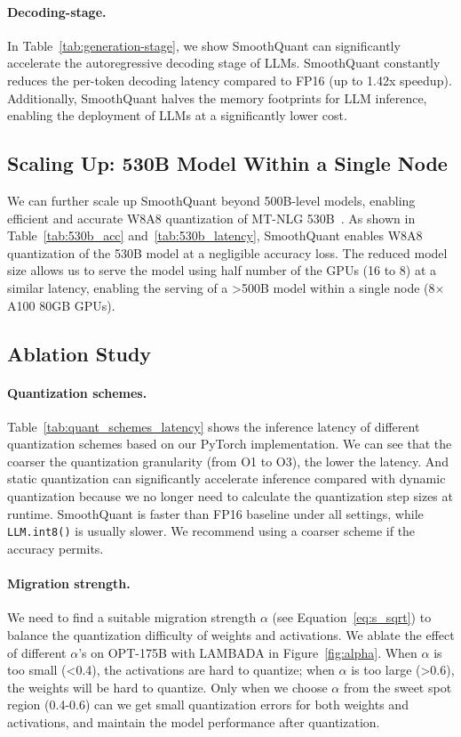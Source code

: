 \paragraph{Decoding-stage.}
In Table~\ref{tab:generation-stage}, we show SmoothQuant can significantly accelerate the autoregressive decoding stage of LLMs. SmoothQuant constantly reduces the per-token decoding latency compared to FP16 (up to 1.42x speedup). Additionally, SmoothQuant halves the memory footprints for LLM inference, enabling the deployment of LLMs at a significantly lower cost.

\subsection{Scaling Up: 530B Model Within a Single Node} We can further scale up SmoothQuant beyond 500B-level models, enabling efficient and accurate W8A8 quantization of MT-NLG 530B~\cite{smith2022using}. As shown in Table~\ref{tab:530b_acc} and~\ref{tab:530b_latency}, SmoothQuant enables W8A8 quantization of the 530B model at a negligible accuracy loss. The reduced model size allows us to serve the model using half number of the GPUs (16 to 8) at a similar latency, enabling the serving of a >500B model within a single node (8$\times$A100 80GB GPUs). 

\subsection{Ablation Study}
\paragraph{Quantization schemes.}
Table~\ref{tab:quant_schemes_latency} shows the inference latency of different quantization schemes based on our PyTorch implementation. We can see that the coarser the quantization granularity (from O1 to O3), the lower the latency. And static quantization can significantly accelerate inference compared with dynamic quantization because we no longer need to calculate the quantization step sizes at runtime. SmoothQuant is faster than FP16 baseline under all settings, while \texttt{LLM.int8()} is usually slower. We recommend using a coarser scheme if the accuracy permits.

\paragraph{Migration strength.} We need to find a suitable migration strength $\alpha$ (see Equation~\ref{eq:s_sqrt}) to balance the quantization difficulty of weights and activations. We ablate the effect of different $\alpha$'s on OPT-175B with LAMBADA in Figure~\ref{fig:alpha}. When $\alpha$ is too small (<0.4), the activations are hard to quantize; when $\alpha$ is too large (>0.6), the weights will be hard to quantize. Only when we choose $\alpha$ from the sweet spot region (0.4-0.6) can we get small quantization errors for both weights and activations, and maintain the model performance after quantization.

